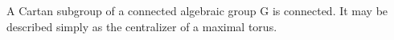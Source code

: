 A Cartan subgroup of a connected algebraic group G is connected. It may be described simply as the centralizer of a maximal torus.
